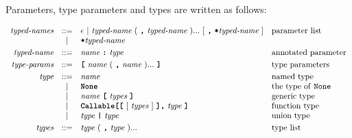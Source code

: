 Parameters, type parameters and types are written as follows:

\[\begin{array}{rcll}

\textit{typed-names}        & ::= & \epsilon\ |\ \textit{typed-name}\ (\ \term{,}\ \textit{typed-name}\ )...
                                    \ [\ \term{,}\ \term{*}\textit{typed-name}\ ]                                             & \text{parameter list}                   \\
                            & |   & \term{*}\textit{typed-name}                                                              &                                         \\[1mm]
\textit{typed-name}         & ::= & \textit{name}\ \term{:}\ \textit{type}                                                   & \text{annotated parameter}              \\[1mm]
\textit{type-params}        & ::= & \term{[}\ \textit{name}\ (\ \term{,}\ \textit{name}\ )...\ \term{]}                      & \text{type parameters}                  \\[1mm]
\textit{type}               & ::= & \textit{name}                                                                            & \text{named type}                       \\
                            & |   & \term{None}                                                                              & \text{the type of \texttt{None}}        \\
                            & |   & \textit{name}\ \term{[}\ \textit{types}\ \term{]}                                       & \text{generic type}                     \\
                            & |   & \term{Callable[[}\ [\ \textit{types}\ ]\ \term{],}\ \textit{type}\ \term{]}             & \text{function type}                    \\
                            & |   & \textit{type}\ \term{|}\ \textit{type}                                                   & \text{union type}                       \\[1mm]
\textit{types}              & ::= & \textit{type}\ (\ \term{,}\ \textit{type}\ )...                                          & \text{type list}                        \\


\end{array}\]
